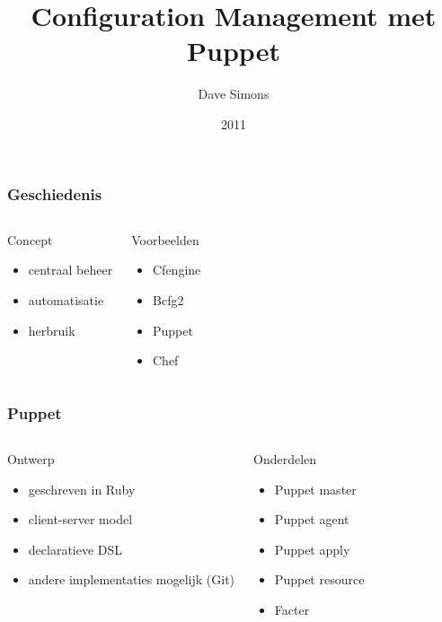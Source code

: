\documentclass{beamer}
\begin{document}
\title{Configuration Management met Puppet}
\author[D. Simons]{Dave Simons}
\date{2011}
\maketitle


\begin{frame}
\frametitle{Geschiedenis}
\begin{columns}[t]
\begin{block}{Concept}
\begin{itemize}
	\item centraal beheer
	\item automatisatie
	\item herbruik
\end{itemize}
\end{block}
\begin{block}{Voorbeelden}
\begin{itemize}
	\item Cfengine
	\item Bcfg2
	\item Puppet
	\item Chef
\end{itemize}
\end{block}
\end{columns}
\end{frame}

\begin{frame}
\frametitle{Puppet}
\begin{columns}[c]
\begin{block}{Ontwerp}
\begin{itemize}
	\item geschreven in Ruby
	\item client-server model
	\item declaratieve DSL
	\item andere implementaties mogelijk (Git)
\end{itemize}
\end{block}
\begin{block}{Onderdelen}
\begin{itemize}
	\item Puppet master
	\item Puppet agent
	\item Puppet apply
	\item Puppet resource
	\item Facter
\end{itemize}
\end{block}
\end{columns}
\end{frame}
\end{document}
